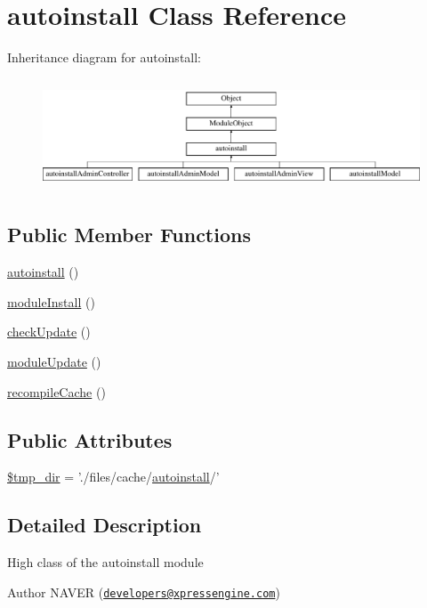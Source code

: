\hypertarget{classautoinstall}{\section{autoinstall Class Reference}
\label{classautoinstall}
}
Inheritance diagram for autoinstall\-:\begin{figure}[H]
\begin{center}
\leavevmode
\includegraphics[height=3.353293cm]{classautoinstall}
\end{center}
\end{figure}
\subsection*{Public Member Functions}
\begin{DoxyCompactItemize}
\item 
\hyperlink{classautoinstall_aa76d5fcbf6ac9450b810acefa4b85a51}{autoinstall} ()
\item 
\hyperlink{classautoinstall_ad783aa6031577dca5fdcc7f6ea61f452}{module\-Install} ()
\item 
\hyperlink{classautoinstall_a74f260b0d1254c8e4dbd69b532072a95}{check\-Update} ()
\item 
\hyperlink{classautoinstall_a856f1e61cac8e20ed0df58a6a10f61a8}{module\-Update} ()
\item 
\hyperlink{classautoinstall_a7455962a1f07ea4c4e28971fa8dde715}{recompile\-Cache} ()
\end{DoxyCompactItemize}
\subsection*{Public Attributes}
\begin{DoxyCompactItemize}
\item 
\hyperlink{classautoinstall_a157882a0b8cc81818aa516880f2ba5dc}{\$tmp\-\_\-dir} = './files/cache/\hyperlink{classautoinstall}{autoinstall}/'
\end{DoxyCompactItemize}


\subsection{Detailed Description}
High class of the autoinstall module \begin{DoxyAuthor}{Author}
N\-A\-V\-E\-R (\href{mailto:developers@xpressengine.com}{\tt developers@xpressengine.\-com}) 
\end{DoxyAuthor}


